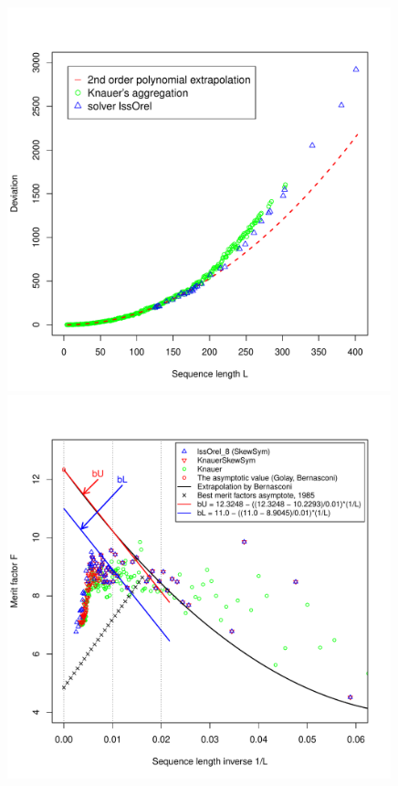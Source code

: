 \begin{figure}[t!]
\begin{minipage}{0.49\textwidth}
\includegraphics[width=0.99\textwidth]{fg-R-labs-wide-4-figures-a}
\vspace*{-5ex}%
\end{minipage}
\begin{minipage}{0.49\textwidth}
\includegraphics[width=0.99\textwidth]{fg-R-labs-wide-4-figures-b}

\end{minipage}
\end{figure}

